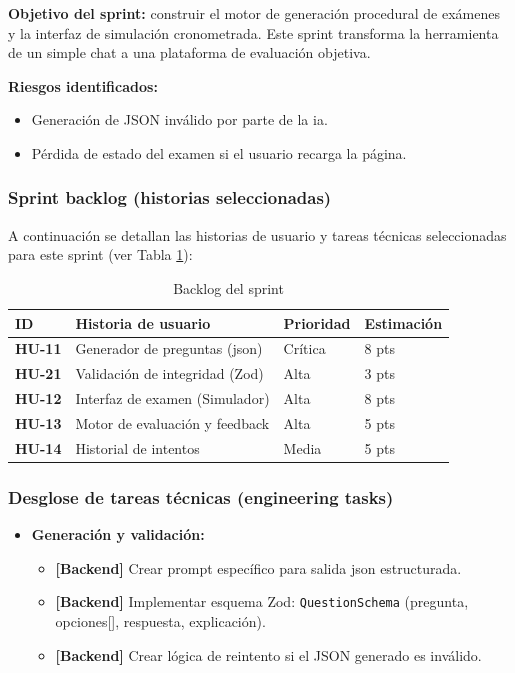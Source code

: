 \textbf{Objetivo del sprint:} construir el motor de generación procedural de exámenes y la interfaz de simulación cronometrada. Este sprint transforma la herramienta de un simple chat a una plataforma de evaluación objetiva.

\textbf{Riesgos identificados:}
\begin{itemize}
\item Generación de JSON inválido por parte de la \gls{ia}.
\item Pérdida de estado del examen si el usuario recarga la página.
\end{itemize}

\subsubsection{Sprint backlog (historias seleccionadas)}

A continuación se detallan las historias de usuario y tareas técnicas seleccionadas para este sprint (ver Tabla \ref{tab:backlog_sprint3}):

\begin{table}[h]
\centering
\begin{tabularx}{0.95\textwidth}{|l|X|l|l|}
\hline
\textbf{ID} & \textbf{Historia de usuario} & \textbf{Prioridad} & \textbf{Estimación} \\
\hline
\textbf{HU-11} & Generador de preguntas (\gls{json}) & Crítica & 8 pts \\
\hline
\textbf{HU-21} & Validación de integridad (Zod) & Alta & 3 pts \\
\hline
\textbf{HU-12} & Interfaz de examen (Simulador) & Alta & 8 pts \\
\hline
\textbf{HU-13} & Motor de evaluación y feedback & Alta & 5 pts \\
\hline
\textbf{HU-14} & Historial de intentos & Media & 5 pts \\
\hline
\end{tabularx}
\caption{Backlog del sprint}
\label{tab:backlog_sprint3}
\end{table}

\subsubsection{Desglose de tareas técnicas (engineering tasks)}

\begin{itemize}
\item \textbf{Generación y validación:}
\begin{itemize}
\item \textbf{[Backend]} Crear prompt específico para salida \gls{json} estructurada.
\item \textbf{[Backend]} Implementar esquema Zod: \texttt{QuestionSchema} (pregunta, opciones[], respuesta, explicación).
\item \textbf{[Backend]} Crear lógica de reintento si el JSON generado es inválido.
\end{itemize}
\end{itemize}

